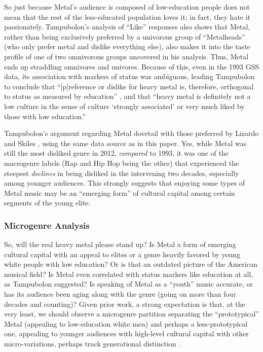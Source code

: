 \documentclass[a4paper,12pt]{extarticle}
\begin{document}
So just because Metal's audience is composed of low-education people does not mean that the rest of the less-educated population loves it; in fact, they hate it passionately. Tampubolon's analysis of ``Like'' responses also shows that Metal, rather than being exclusively preferred by a univorous group of ``Metalheads'' (who only prefer metal and dislike everything else), also makes it into the taste profile of one of two omnivorous groups uncovered in his analysis. Thus, Metal ends up straddling omnivores and univores. Because of this, even in the 1993 GSS data, its association with markers of status was ambiguous, leading Tampubolon to conclude that ``[p]reference or dislike for heavy metal is, therefore, orthogonal to status as measured by education'' \citeyearpar[][257]{tampubolon2008revisiting}, and that ``heavy metal is definitely not a low culture in the sense of culture `strongly associated' or very much liked by those with low education.''

Tampubolon's argument regarding Metal dovetail with those preferred by Lizardo and Skiles \citeyearpar{lizardo_skiles15}, using the same data source as in this paper. Yes, while Metal was still the most disliked genre in 2012, \textit{compared} to 1993, it was one of the macrogenre labels (Rap and Hip Hop being the other) that experienced the steepest \textit{declines} in being disliked in the intervening two decades, especially among younger audiences. This strongly suggests that enjoying some types of Metal music may be an ``emerging form'' of cultural capital \cite{prieur2013emerging} among certain segments of the young elite.  

\subsubsection{Microgenre Analysis}
So, will the real heavy metal please stand up? Is Metal a form of emerging cultural capital with an appeal to elites or a genre heavily favored by young white people with low education? Or is that an outdated picture of the American musical field? Is Metal even correlated with status markers like education at all, as Tampubolon suggested? Is speaking of Metal as a ``youth'' music accurate, or has its audience been aging along with the genre (going on more than four decades and counting)? Given prior work, a strong expectation is that, at the very least, we should observe a microgenre partition separating the ``prototypical'' Metal (appealing to low-education white men) and perhaps a less-prototypical one, appealing to younger audiences with high-level cultural capital with other micro-variations, perhaps track generational distinction \citep{lizardo_skiles15}.
\end{document}
